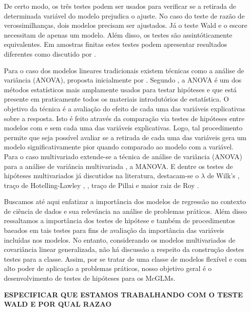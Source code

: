 De certo modo, os três testes podem ser usados para verificar se a retirada de determinada variável do modelo prejudica o ajuste. No caso do teste de razão de verossimilhanças, dois modelos precisam ser ajustados. Já o teste Wald e o escore necessitam de apenas um modelo. Além disso, os testes são assintóticamente equivalentes. Em amostras finitas estes testes podem apresentar resultados diferentes como discutido por \citet{conflict}.


Para o caso dos modelos lineares tradicionais existem técnicas como a análise de variância (ANOVA), proposta inicialmente por \citet{anova_fisher}. Segundo \citet{anova1}, a ANOVA é um dos métodos estatísticos mais amplamente usados para testar hipóteses e que está presente em praticamente todos os materiais introdutórios de estatística. O objetivo da técnica é a avaliação do efeito de cada uma das variáveis explicativas sobre a resposta. Isto é feito através da comparação via testes de hipóteses entre modelos com e sem cada uma das variáveis explicativas. Logo, tal procedimento permite que seja possível avaliar se a retirada de cada uma das variáveis gera um modelo significativamente pior quando comparado ao modelo com a variável. Para o caso multivariado extende-se a técnica de análise de variância (ANOVA) para a análise de variância  multivariada \citep{manova}, a MANOVA. E dentre os testes de hipóteses multivariados já discutidos na literatura, destacam-se o $\lambda$ de Wilk's \citep{wilks}, traço de Hotelling-Lawley \citep{lawley}, \citep{hotelling}, traço de Pillai \citep{pillai} e maior raiz de Roy \citep{roy}. 


Buscamos até aqui enfatizar a importância dos modelos de regressão no contexto de ciência de dados e sua relevância na análise de problemas práticos. Além disso ressaltamos a importância dos testes de hipótese e também de procedimentos baeados em tais testes para fins de avaliação da importância das variáveis incluídas nos modelos. No entanto, considerando os modelos multivariados de covariância linear generalizada, não há discussão a respeito da construção destes testes para a classe. Assim, por se tratar de uma classe de modelos flexível e com alto poder de aplicação a problemas práticos, nosso objetivo geral é o desenvolvimento de testes de hipóteses para os McGLMs.

\textbf{ESPECIFICAR QUE ESTAMOS TRABALHANDO COM O TESTE WALD E POR QUAL RAZAO}

